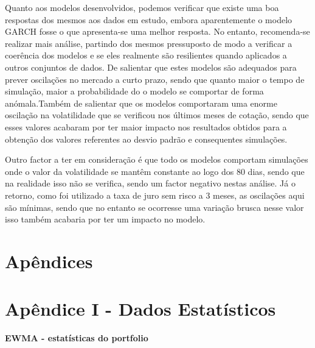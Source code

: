 \documentclass[
  12pt,
  a4paper,
  openany]{book}
\theoremstyle{definition}
\theoremstyle{definition}
\theoremstyle{definition}
\theoremstyle{remark}
\begin{document}
Quanto aos modelos desenvolvidos, podemos verificar que existe uma boa respostas dos mesmos aos dados em estudo, embora aparentemente o modelo GARCH fosse o que apresenta-se uma melhor resposta. No entanto, recomenda-se realizar mais análise, partindo dos mesmos pressuposto de modo a verificar a coerência dos modelos e se eles realmente são resilientes quando aplicados a outros conjuntos de dados. De salientar que estes modelos são adequados para prever oscilações no mercado a curto prazo, sendo que quanto maior o tempo de simulação, maior a probabilidade do o modelo se comportar de forma anómala.Também de salientar que os modelos comportaram uma enorme oscilação na volatilidade que se verificou nos últimos meses de cotação, sendo que esses valores acabaram por ter maior impacto nos resultados obtidos para a obtenção dos valores referentes ao desvio padrão e consequentes simulações.

Outro factor a ter em consideração é que todo os modelos comportam simulações onde o valor da volatilidade se mantêm constante ao logo dos 80 dias, sendo que na realidade isso não se verifica, sendo um factor negativo nestas análise. Já o retorno, como foi utilizado a taxa de juro sem risco a 3 meses, as oscilações aqui são mínimas, sendo que no entanto se ocorresse uma variação brusca nesse valor isso também acabaria por ter um impacto no modelo.

  

\part*{Apêndices}

\newpage
\part*{\normalfont\huge\bfseries\centering Apêndice I - Dados Estatísticos}
\newpage

\begin{center}
 {\normalfont\Large\bfseries EWMA - estatísticas do portfolio}
\end{center}
\end{document}
